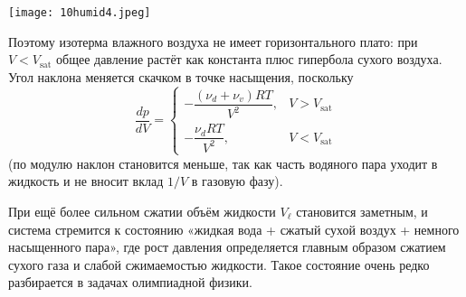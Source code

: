 \documentclass[12pt, a4paper]{article}%
\begin{document}
\begin{center}
\texttt{[image: 10humid4.jpeg]}
\label{fig:mpr}
\end{center}

Поэтому изотерма влажного воздуха не имеет горизонтального плато: при \(V < V_\text{sat}\) общее давление растёт как константа плюс гипербола сухого воздуха. Угол наклона меняется скачком в точке насыщения, поскольку
\[
\frac{dp}{dV}=
\begin{cases}
-\dfrac{(\nu_d+\nu_v) R T}{V^2}, & V > V_\text{sat} \\
-\dfrac{\nu_d R T}{V^2}, & V < V_\text{sat}
\end{cases}
\]
(по модулю наклон становится меньше, так как часть водяного пара уходит в жидкость и не вносит вклад \(1/V\) в газовую фазу).

При ещё более сильном сжатии объём жидкости \(V_{\ell}\) становится заметным, и система стремится к состоянию «жидкая вода + сжатый сухой воздух + немного насыщенного пара», где рост давления определяется главным образом сжатием сухого газа и слабой сжимаемостью жидкости. Такое состояние очень редко разбирается в задачах олимпиадной физики.
\end{document}
